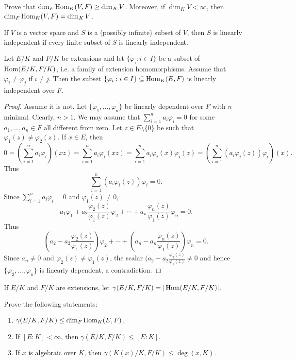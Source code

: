 \begin{exercise}
\label{xca:dim}
    Prove that $\dim_F\operatorname{Hom}_K(V,F)\geq\dim_KV$. Moreover, if 
     $\dim_KV<\infty$, then $\dim_F\operatorname{Hom}_K(V,F)=\dim_KV$.
\end{exercise}

If $V$ is a vector space and $S$ is a (possibly infinite) subset of $V$, 
then $S$ is linearly independent if every finite subset of $S$ is linearly independent. 

\begin{theorem}[Dedekind]
Let $E/K$ and $F/K$ be extensions and let 
$\{\varphi_i:i\in I\}$ 
be a subset of
$\operatorname{Hom}(E/K,F/K)$, i.e. a 
family of extension homomorphisms. Assume that 
$\varphi_i\ne \varphi_j$ if $i\ne j$. Then 
the subset $\{\varphi_i:i\in I\}\subseteq\operatorname{Hom}_K(E,F)$ 
is linearly independent over $F$. 
\end{theorem}

\begin{proof}
    Assume it is not. Let $\{\varphi_1,\dots,\varphi_n\}$ 
    be linearly dependent over $F$ with $n$ minimal. Clearly, $n>1$. 
    We may assume that 
    $\sum_{i=1}^n a_i\varphi_i=0$ for some $a_1,\dots,a_n\in F$ all different from zero. 
    Let
    $z\in E\setminus\{0\}$ be such that $\varphi_1(z)\ne\varphi_2(z)$. If $x\in E$, then
    \[
    0=\left(\sum_{i=1}^na_i\varphi_i\right)(xz)=\sum_{i=1}^na_i\varphi_i(xz)
    =\sum_{i=1}^na_i\varphi_i(x)\varphi_i(z)
    =\left(\sum_{i=1}^n (a_i\varphi_i(z))\varphi_i\right)(x).
    \]
    Thus 
    \[
    \sum_{i=1}^n (a_i\varphi_i(z))\varphi_i=0.
    \]
    Since $\sum_{i=1}^na_i\varphi_i=0$ and $\varphi_1(z)\ne0$, 
    \[
    a_1\varphi_1+a_2\frac{\varphi_2(z)}{\varphi_1(z)}\varphi_2+\cdots+a_n\frac{\varphi_n(z)}{\varphi_1(z)}\varphi_n=0.
    \]
    Thus
    \[
    \left(a_2-a_2\frac{\varphi_2(z)}{\varphi_1(z)}\right)\varphi_2
    +\cdots+\left(a_n-a_n\frac{\varphi_n(z)}{\varphi_1(z)}\right)\varphi_n=0.
    \]
    Since $a_n\ne 0$ and $\varphi_2(z)\ne\varphi_1(z)$, 
    the scalar $(a_2-a_2\frac{\varphi_2(z)}{\varphi_1(z)}\ne 0$ and hence 
    $\{\varphi_2,\dots,\varphi_n\}$ is linearly dependent, a contradiction. 
\end{proof}

If $E/K$ and $F/K$ are extensions, 
let $\gamma(E/K,F/K)=|\operatorname{Hom}(E/K,F/K)|$. 

\begin{exercise}
Prove the following statements:
\begin{enumerate}
    \item $\gamma(E/K,F/K)\leq\dim_F\operatorname{Hom}_K(E,F)$.
    \item If $[E:K]<\infty$, then $\gamma(E/K,F/K)\leq[E:K]$. 
    \item If $x$ is algebraic over $K$, then $\gamma(K(x)/K,F/K)\leq\deg(x,K)$.
\end{enumerate}
\end{exercise}

